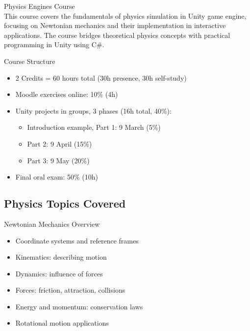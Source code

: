 \begin{concept}{Physics Engines Course}\\
    This course covers the fundamentals of physics simulation in Unity game engine, focusing on Newtonian mechanics and their implementation in interactive applications. The course bridges theoretical physics concepts with practical programming in Unity using C\#.
\end{concept}

\begin{definition}{Course Structure}
    \begin{itemize}
        \item 2 Credits = 60 hours total (30h presence, 30h self-study)
        \item Moodle exercises online: 10\% (4h)
        \item Unity projects in groups, 3 phases (16h total, 40\%):
        \begin{itemize}
            \item Introduction example, Part 1: 9 March (5\%)
            \item Part 2: 9 April (15\%)
            \item Part 3: 9 May (20\%)
        \end{itemize}
        \item Final oral exam: 50\% (10h)
    \end{itemize}
\end{definition}

\subsection{Physics Topics Covered}

\begin{definition}{Newtonian Mechanics Overview}
    \begin{itemize}
        \item Coordinate systems and reference frames
        \item Kinematics: describing motion
        \item Dynamics: influence of forces
        \item Forces: friction, attraction, collisions
        \item Energy and momentum: conservation laws
        \item Rotational motion applications
    \end{itemize}
\end{definition}

